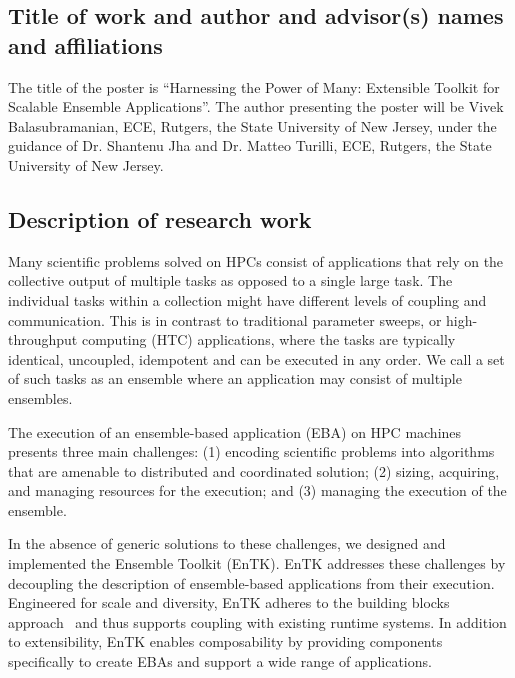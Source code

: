 \subsection{Title of work and author and advisor(s) names and affiliations}

The title of the poster is ``Harnessing the Power of Many: Extensible Toolkit 
for Scalable Ensemble Applications''. The author presenting the poster will be 
Vivek Balasubramanian, ECE, Rutgers, the State University of New Jersey, under 
the guidance of Dr. Shantenu Jha and Dr. Matteo Turilli, ECE, Rutgers, the State
University of New Jersey.

\subsection{Description of research work}

Many scientific problems solved on HPCs consist of applications that rely on the
collective output of multiple tasks as opposed to a single large task. The 
individual tasks within a collection might have different levels of coupling
and communication. This is in contrast to traditional parameter sweeps, or 
high-throughput computing (HTC) applications, where the tasks are typically
identical, uncoupled, idempotent and can be executed in any order. We call a
set of such tasks as an ensemble where an application may consist of multiple 
ensembles.

The execution of an ensemble-based application (EBA) on HPC machines presents 
three main challenges: (1) encoding scientific problems into algorithms that are 
amenable to distributed and coordinated solution; (2) sizing, acquiring, and 
managing resources for the execution; and (3) managing the execution of the 
ensemble.

In the absence of generic solutions to these challenges, we designed and 
implemented the Ensemble Toolkit (EnTK). EnTK addresses these challenges by 
decoupling the description of ensemble-based applications from their execution.
Engineered for scale and diversity, EnTK adheres to the building blocks 
approach~\cite{review_bb_2016} and thus supports coupling with existing runtime 
systems. In addition to extensibility, EnTK enables composability by providing 
components specifically to create EBAs
and support a wide range of applications.

